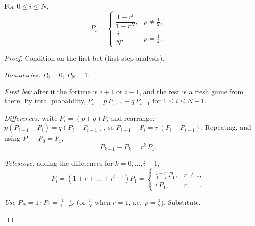 \begin{pic}
\end{pic}

\begin{theorem}
\label{thm:ruin}
For $0\le i\le N$,
\[
  P_i=\begin{cases}\dfrac{1-r^i}{1-r^N},&p\ne\frac12,\\[2ex] \dfrac iN,&p=\frac12.\end{cases}
\]
\end{theorem}
\begin{proof}
Condition on the first bet (first-step analysis).
\begin{steps}
  \item \emph{Boundaries:} $P_0=0$, $P_N=1$.
  \item \emph{First bet:} after it the fortune is $i+1$ or $i-1$, and the rest is a fresh game from there. By total probability, $P_i=p\,P_{i+1}+q\,P_{i-1}$ for $1\le i\le N-1$.
  \item \emph{Differences:} write $P_i=(p+q)P_i$ and rearrange: $p(P_{i+1}-P_i)=q(P_i-P_{i-1})$, so $P_{i+1}-P_i=r\,(P_i-P_{i-1})$. Repeating, and using $P_1-P_0=P_1$,
  \[
    P_{k+1}-P_k=r^k\,P_1 .
  \]
  \item \emph{Telescope:} adding the differences for $k=0,\dots,i-1$,
  \[
    P_i=(1+r+\dots+r^{i-1})P_1=\begin{cases}\frac{1-r^i}{1-r}P_1,&r\ne1,\\ i\,P_1,&r=1.\end{cases}
  \]
  \item \emph{Use $P_N=1$:} $P_1=\frac{1-r}{1-r^N}$ (or $\frac1N$ when $r=1$, i.e.\ $p=\frac12$). Substitute. \qedhere
\end{steps}
\end{proof}

